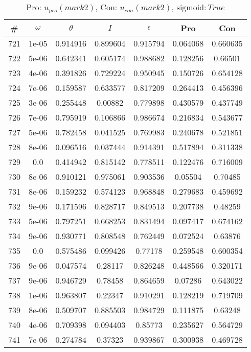 \newpage
\begin{table}
\caption{Pro: $u_{pro} (mark 2)$, Con: $u_{con} (mark 2)$, $\mathrm{sigmoid}: True$}
\begin{tabular*}{\linewidth}{c|c|c|c|c|c|c}
\# & $\omega$ & $\theta$ & $I$ & $\epsilon$ & Pro & Con \\
\hline
721 & 1e-05 & 0.914916 & 0.899604 & 0.915794 & 0.064068 & 0.660635\\
722 & 5e-06 & 0.642341 & 0.605174 & 0.988682 & 0.128256 & 0.66501\\
723 & 4e-06 & 0.391826 & 0.729224 & 0.950945 & 0.150726 & 0.654128\\
724 & 7e-06 & 0.159587 & 0.633577 & 0.817209 & 0.264413 & 0.456396\\
725 & 3e-06 & 0.255448 & 0.00882 & 0.779898 & 0.430579 & 0.437749\\
726 & 7e-06 & 0.795919 & 0.106866 & 0.986674 & 0.216834 & 0.543677\\
727 & 5e-06 & 0.782458 & 0.041525 & 0.769983 & 0.240678 & 0.521851\\
728 & 8e-06 & 0.096516 & 0.037444 & 0.914391 & 0.517894 & 0.311338\\
729 & 0.0 & 0.414942 & 0.815142 & 0.778511 & 0.122476 & 0.716009\\
730 & 8e-06 & 0.910121 & 0.975061 & 0.903536 & 0.05504 & 0.70485\\
731 & 8e-06 & 0.159232 & 0.574123 & 0.968848 & 0.279683 & 0.459692\\
732 & 9e-06 & 0.171596 & 0.828717 & 0.849513 & 0.207738 & 0.48259\\
733 & 5e-06 & 0.797251 & 0.668253 & 0.831494 & 0.097417 & 0.674162\\
734 & 9e-06 & 0.930771 & 0.808548 & 0.762449 & 0.072524 & 0.63876\\
735 & 0.0 & 0.575486 & 0.099426 & 0.77178 & 0.259548 & 0.600354\\
736 & 9e-06 & 0.047574 & 0.28117 & 0.826248 & 0.448566 & 0.320171\\
737 & 9e-06 & 0.946729 & 0.78458 & 0.864659 & 0.07286 & 0.643022\\
738 & 1e-06 & 0.963807 & 0.22347 & 0.910291 & 0.128219 & 0.719709\\
739 & 8e-06 & 0.509707 & 0.885503 & 0.984729 & 0.111875 & 0.63248\\
740 & 4e-06 & 0.709398 & 0.094403 & 0.85773 & 0.235627 & 0.564729\\
741 & 7e-06 & 0.274784 & 0.37323 & 0.939867 & 0.300938 & 0.469728\\

\end{tabular*}
\end{table}
